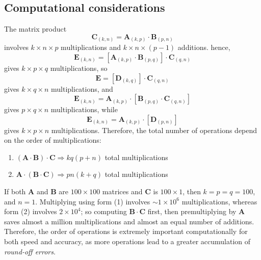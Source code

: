 \subsection{Computational considerations}
The matrix product
\begin{equation}
\mathbf{C}_{(k,n)} = \mathbf{A}_{(k,p)} \cdot \mathbf{B}_{(p,n)}
\end{equation}
involves $k \times n \times p$ multiplications and $k \times n  \times (p -1)$ additions.  hence,
\begin{equation}
\mathbf{E}_{(k,n)} = [ \mathbf{A}_{(k,p)} \cdot \mathbf{B}_{(p,q)}] \cdot \mathbf{C}_{(q,n)}
\end{equation}	 
gives $k \times p \times q$ multiplications, so
\begin{equation}
\mathbf{E} = [\mathbf{D}_{(k,q)}] \cdot \mathbf{C}_{(q,n)}
\end{equation}
gives $k\times q \times n$ multiplications, and
\begin{equation}
\mathbf{E} _{(k,n)} = \mathbf{A}_{(k,p)} \cdot [\mathbf{B}_{(p,q)} \cdot \mathbf{C}_{(q,n)}]
\end{equation}
gives $p\times q \times n$ multiplications, while
\begin{equation}
\mathbf{E}_{(k,n)} = \mathbf{A}_{(k,p)}\cdot [\mathbf{D}_{(p,n)} ]
\end{equation}	
gives $k \times p \times n$ multiplications. Therefore, the total number of operations depend on the order of multiplications:
\begin{enumerate}
\item $\mathbf{(A \cdot B) \cdot C} \Rightarrow kq(p+n)$ total multiplications
\item $\mathbf{A \cdot (B \cdot C)} \Rightarrow pn(k+q)$ total multiplications
\end{enumerate}
If both $\mathbf{A}$ and $\mathbf{B}$ are $100 \times 100$ matrices and $\mathbf{C}$ is $100 \times 1$, then $k = p = q = 100$, and $n 
= 1$. Multiplying using form (1) involves $\sim 1 \times 10^6$ multiplications, whereas form (2) involves $2 \times 
10^4$; so computing $\mathbf{B \cdot C}$ first, then premultiplying by $\mathbf{A}$ saves almost a million multiplications 
and almost an equal number of additions. Therefore, the order of operations is extremely important 
computationally for both speed and accuracy, as more operations lead to a greater accumulation of 
\emph{round-off errors}.

